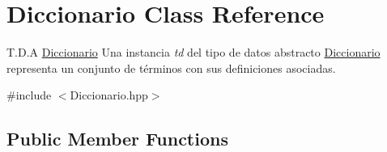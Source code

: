 \hypertarget{class_diccionario}{}\section{Diccionario Class Reference}
\label{class_diccionario}


T.\+D.\+A \mbox{\hyperlink{class_diccionario}{Diccionario}} Una instancia {\itshape td} del tipo de datos abstracto {\ttfamily \mbox{\hyperlink{class_diccionario}{Diccionario}}} representa un conjunto de términos con sus definiciones asociadas.  




{\ttfamily \#include $<$Diccionario.\+hpp$>$}

\subsection*{Public Member Functions}

